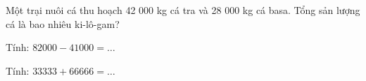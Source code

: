 \begin{ex}
Một trại nuôi cá thu hoạch 42 000 kg cá tra và 28 000 kg cá basa. Tổng sản lượng cá là bao nhiêu ki-lô-gam?
\end{ex}

\begin{ex}
Tính: $82000 - 41000 = \dots$
\end{ex}

\begin{ex}
Tính: $33333 + 66666 = \dots$
\end{ex}
